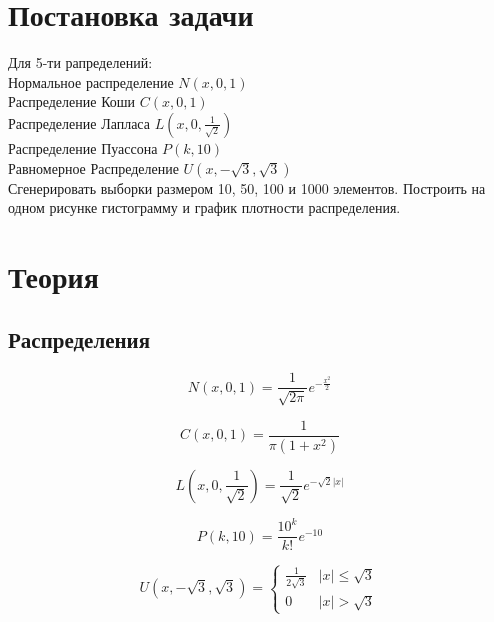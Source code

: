 \documentclass[a4]{article}
\begin{document}
	
	\newpage
	\tableofcontents{}
	\newpage
	\listoffigures
	\newpage
	
	
	\section{Постановка задачи}
	
	Для 5-ти рапределений:\\
		Нормальное распределение $N(x,0,1)$\\
		Распределение Коши $C(x,0,1)$\\
		Распределение Лапласа $L( x,0,\frac{1}{\sqrt{2}})$\\
		Распределение Пуассона $P(k, 10)$\\
		Равномерное Распределение $U(x,-\sqrt{3}, \sqrt{3})$\\
		
		Сгенерировать выборки размером 10, 50, 100 и 1000 элементов.
		Построить на одном рисунке гистограмму и график плотности распределения.
		
	
	\section{Теория}
		\subsection{Распределения}
		
			\begin{equation}\label{eqn:normal}
			N(x,0,1) = \frac{1}{\sqrt{2\pi}}e^{-\frac{x^2}{2}}
			\end{equation} 
			
			\begin{equation}\label{eqn:cauchy}
			C(x,0,1) = \frac{1}{\pi(1+x^2)}
			\end{equation}
			
			\begin{equation}\label{eqn:laplace}
			L\left( x,0,\frac{1}{\sqrt{2}}\right) = \frac{1}{\sqrt{2}}e^{-\sqrt{2}\vert x\vert}
			\end{equation}
			
			\begin{equation}\label{eqn:poisson}
			P(k,10) = \frac{10^k}{k!}e^{-10}
			\end{equation}  
			
			\begin{equation}\label{eqn:uniform}
			U(x,-\sqrt{3}, \sqrt{3}) = 
			\begin{cases}
			\frac{1}{2\sqrt{3}} &\vert x\vert \leqslant \sqrt{3}\\
			0 &\vert x\vert > \sqrt{3}
			\end{cases}
			\end{equation}
		
\end{document}
